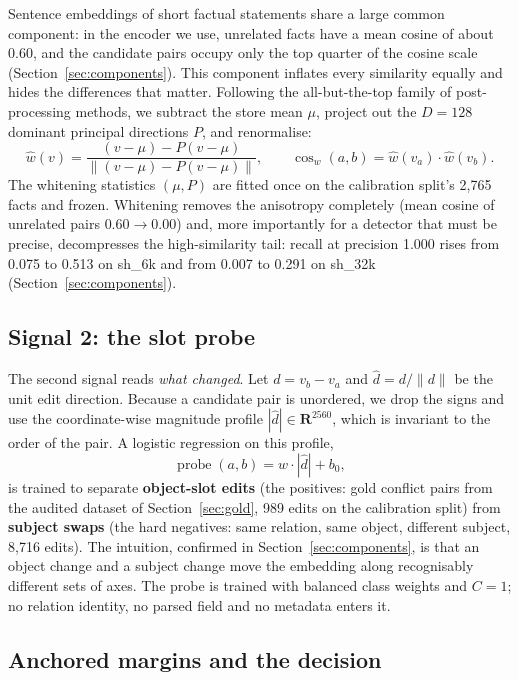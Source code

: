 \documentclass[journal=jcisd8,manuscript=article]{achemso}
\begin{document}
Sentence embeddings of short factual statements share a large common component: in the encoder we use, unrelated facts have a mean cosine of about 0.60, and the candidate pairs occupy only the top quarter of the cosine scale (Section~\ref{sec:components}). This component inflates every similarity equally and hides the differences that matter. Following the all-but-the-top family of post-processing methods, we subtract the store mean $\mu$, project out the $D=128$ dominant principal directions $P$, and renormalise:
\begin{equation}
\hat w(v)=\frac{(v-\mu)-P(v-\mu)}{\lVert(v-\mu)-P(v-\mu)\rVert},\qquad
\operatorname{cos}_w(a,b)=\hat w(v_a)\cdot\hat w(v_b).
\end{equation}
The whitening statistics $(\mu,P)$ are fitted once on the calibration split's 2,765 facts and frozen. Whitening removes the anisotropy completely (mean cosine of unrelated pairs $0.60\to0.00$) and, more importantly for a detector that must be precise, decompresses the high-similarity tail: recall at precision 1.000 rises from 0.075 to 0.513 on sh\_6k and from 0.007 to 0.291 on sh\_32k (Section~\ref{sec:components}).

\subsection{Signal 2: the slot probe}
\label{sec:probe}

The second signal reads \emph{what changed}. Let $d=v_b-v_a$ and $\hat d=d/\lVert d\rVert$ be the unit edit direction. Because a candidate pair is unordered, we drop the signs and use the coordinate-wise magnitude profile $|\hat d|\in\mathbf{R}^{2560}$, which is invariant to the order of the pair. A logistic regression on this profile,
\begin{equation}
\operatorname{probe}(a,b)=w\cdot|\hat d|+b_0,
\end{equation}
is trained to separate \textbf{object-slot edits} (the positives: gold conflict pairs from the audited dataset of Section~\ref{sec:gold}, 989 edits on the calibration split) from \textbf{subject swaps} (the hard negatives: same relation, same object, different subject, 8,716 edits). The intuition, confirmed in Section~\ref{sec:components}, is that an object change and a subject change move the embedding along recognisably different sets of axes. The probe is trained with balanced class weights and $C=1$; no relation identity, no parsed field and no metadata enters it.

\subsection{Anchored margins and the decision}
\label{sec:margins}
\end{document}
